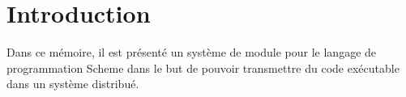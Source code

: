 
\chapter*{Introduction}

Dans ce mémoire, il est présenté un système de module
pour le langage de programmation Scheme dans le but
de pouvoir transmettre du code exécutable dans un système
distribué.



